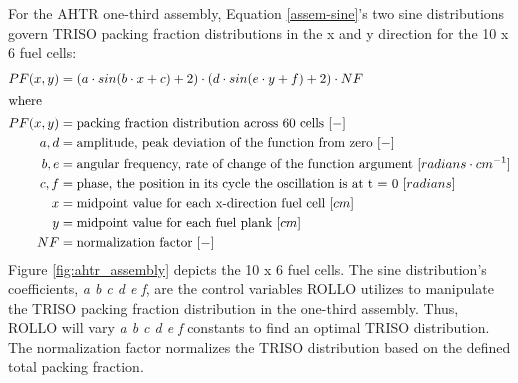 For the \gls{AHTR} one-third assembly, Equation \ref{assem-sine}'s two sine 
distributions govern \gls{TRISO} packing fraction distributions in the x and y direction 
for the 10 x 6 fuel cells:
\begin{align}
    \label{assem-sine}
    PF(x, y) &= \left(a\cdot sin(b\cdot x + c) + 2\right) 
    \cdot \left(d\cdot sin(e\cdot y + f) + 2\right) \cdot NF \\
    \intertext{where}
    PF(x, y) &= \mbox{packing fraction distribution across 60 cells } [-] \nonumber \\ 
    a, d &= \mbox{amplitude, peak deviation of the function from zero } [-] \nonumber \\
    b, e &= \mbox{angular frequency, rate of change of the function argument } [radians \cdot cm^{-1}] \nonumber \\
    c, f &= \mbox{phase, the position in its cycle the oscillation is at t = 0 } [radians]\nonumber \\
    x &= \mbox{midpoint value for each x-direction fuel cell } [cm]\nonumber \\
    y &= \mbox{midpoint value for each fuel plank } [cm]\nonumber \\
    NF &= \mbox{normalization factor } [-]\nonumber
\end{align}
Figure \ref{fig:ahtr_assembly} depicts the 10 x 6 fuel cells.
The sine distribution's coefficients, \textit{a b c d e f}, are the control variables 
\gls{ROLLO} utilizes to manipulate the TRISO packing fraction distribution in the 
one-third assembly.
Thus, \gls{ROLLO} will vary \textit{a b c d e f} constants to find an optimal TRISO 
distribution. 
The normalization factor normalizes the \gls{TRISO} distribution based on the 
defined total packing fraction.

